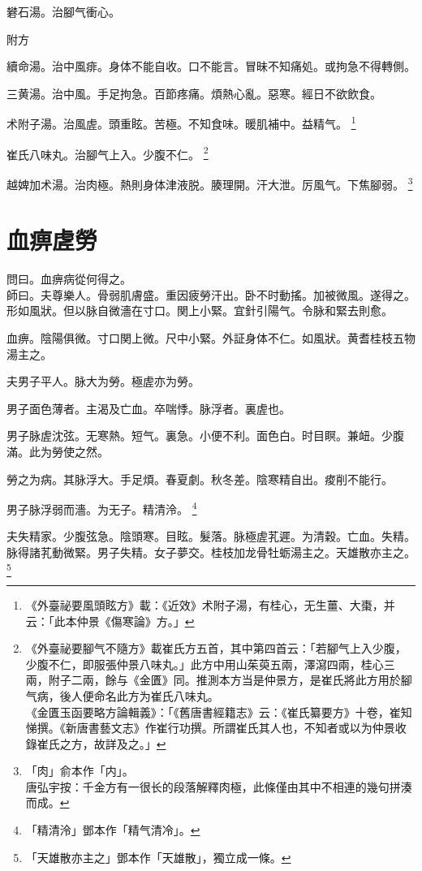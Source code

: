 礬石湯。治腳气衝心。

附方

續命湯。治中風痱。身体不能自收。口不能言。冒昧不知痛処。或拘急不得轉側。

三黄湯。治中風。手足拘急。百節疼痛。煩熱心亂。惡寒。經日不欲飲食。

术附子湯。治風虗。頭重眩。苦極。不知食味。暖肌補中。益精气。
	\footnote{《外臺祕要風頭眩方》載：《近效》术附子湯，有桂心，无生薑、大棗，并云：「此本仲景《傷寒論》方。」}

崔氏八味丸。治腳气上入。少腹不仁。
	\footnote{《外臺祕要腳气不隨方》載崔氏方五首，其中第四首云：「若腳气上入少腹，少腹不仁，即服張仲景八味丸。」此方中用山茱萸五兩，澤瀉四兩，桂心三兩，附子二兩，餘与《金匱》同。推測本方当是仲景方，是崔氏將此方用於腳气病，後人便命名此方为崔氏八味丸。\\《金匱玉函要略方論輯義》：「《舊唐書經籍志》云：《崔氏纂要方》十卷，崔知悌撰。《新唐書藝文志》作崔行功撰。所謂崔氏其人也，不知者或以为仲景收錄崔氏之方，故詳及之。」}

越婢加术湯。治肉極。熱則身体津{\khaaitp 液}脱。腠理開。汗大泄。厉風气。下焦腳弱。
	\footnote{「肉」俞本作「内」。\\唐弘宇按：千金方有一很长的段落解釋肉極，此條僅由其中不相連的幾句拼湊而成。}

\chapter{血痹虗勞}

問曰。血痹病從何得之。\\
師曰。夫尊樂人。骨弱肌膚盛。重因疲勞汗出。卧不时動搖。加被微風。遂得之。{\khaaitp 形如風狀。}但以脉自微濇在寸口。関上小緊。宜針引陽气。令脉和緊去則愈。

血痹。陰陽俱微。寸口関上微。尺中小緊。外証身体不仁。如風狀。黄耆桂枝五物湯主之。

夫男子平人。脉大为勞。極虗亦为勞。

男子面色薄者。主渴及亡血。卒喘悸。脉浮者。裏虗也。

男子脉虗沈弦。无寒熱。短气。裏急。小便不利。面色白。时目瞑。兼衄。少腹滿。此为勞使之然。

勞之为病。其脉浮大。手足煩。春夏劇。秋冬差。陰寒精自出。痠削不能行。

男子脉浮弱而濇。为无子。精清泠。
	\footnote{「精清泠」鄧本作「精气清冷」。}

夫失精家。少腹弦急。陰頭寒。目眩。髮落。脉極虗芤遲。为清穀。亡血。失精。脉得諸芤動微緊。男子失精。女子夢交。桂枝加龙骨牡蛎湯主之。天雄散亦主之。
	\footnote{「天雄散亦主之」鄧本作「天雄散」，獨立成一條。}


